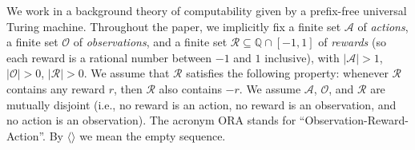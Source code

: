 \documentclass{article}
\begin{document}
We work in a background theory of computability given by a prefix-free
universal Turing machine.
Throughout the paper, we implicitly
fix a finite set $\mathcal A$ of \emph{actions},
a finite set $\mathcal O$ of \emph{observations},
and a finite set $\mathcal R\subseteq \mathbb Q\cap [-1,1]$ of \emph{rewards}
(so each reward is a rational number between $-1$ and $1$ inclusive),
with $|\mathcal A|>1$,
$|\mathcal O|>0$, $|\mathcal R|>0$.
We assume that $\mathcal R$ satisfies the following property:
whenever $\mathcal R$ contains any reward $r$, then $\mathcal R$
also contains $-r$.
We assume $\mathcal A$, $\mathcal O$, and $\mathcal R$ are mutually disjoint
(i.e., no reward is an action, no reward is an observation, and no action is an
observation).
The acronym ORA stands for ``Observation-Reward-Action''.
By $\langle\rangle$ we mean the empty sequence.
\end{document}
